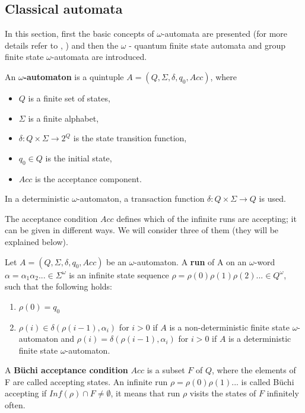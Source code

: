 \documentclass{llncs}
\begin{document}
\subsection{Classical  automata}
%
In this section, first the basic concepts of $\omega$-automata are presented (for more details refer to \cite{SP02}, \cite{T97}) and then the $\omega$ - quantum finite state automata and group finite state $\omega$-automata are introduced.
%
\begin{definition}
An \textbf{$\omega$-automaton} is a quintuple $A = (Q, \Sigma, \delta, q_0, Acc)$, where
\begin{itemize}
\item $Q$ is a finite set of states,
\item $\Sigma$ is a finite alphabet,
\item $\delta : Q \times \Sigma \rightarrow 2^{Q}$ is the state transition function,
\item $q_0 \in Q$ is the initial state,
\item $Acc$ is the acceptance component. 
\end{itemize}
In a deterministic $\omega$-automaton, a transaction function $\delta : Q \times \Sigma \rightarrow Q$ is used.
\end{definition}

The acceptance condition $Acc$ defines which of the infinite runs are accepting; it can be given in different ways. We will consider three of them (they will be explained below). 

\begin{definition}
Let $A = (Q, \Sigma, \delta, q_0, Acc)$ be an $\omega$-automaton. A \textbf{run} of A on an $\omega$-word $\alpha = \alpha_1 \alpha_2 ... \in \Sigma^{\omega}$ is an infinite state sequence $\rho = \rho(0)\rho(1)\rho(2)... \in Q^{\omega}$, such that the following holds:
\begin{enumerate}
\item $\rho(0) = q_0$
\item $\rho(i) \in \delta(\rho (i-1), \alpha _i)$ for $i > 0$ if $A$ is a non-deterministic finite state $\omega$-automaton and $\rho(i) = \delta(\rho(i-1),\alpha_i)$ for $i > 0$ if $A$ is a deterministic finite state $\omega$-automaton.
\end{enumerate}
\end{definition}



\begin{definition}
A \textbf{B\"uchi acceptance condition} $Acc$ is a subset $F$ of $Q$, where the elements of F are called accepting states. An infinite run $\rho=\rho(0)\rho(1)...$ is called B\"uchi accepting if $Inf(\rho)\cap F \neq \emptyset$, it means that run $\rho$ visits the states of $F$ infinitely often.
\end{definition}
\end{document}
